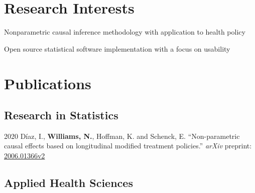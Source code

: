 \documentclass[12pt,letterpaper]{report}
\newcommand{\listitemspace}{0.15em}
\renewenvironment{itemize}
{\begin{list}{}{\setlength{\leftmargin}{0em}
            \setlength{\parskip}{0em}
            \setlength{\itemsep}{\listitemspace}
            \setlength{\parsep}{\listitemspace}}}
    {\end{list}}
\begin{document}
    \section*{Research Interests}

    \begin{itemize}

        \item Nonparametric causal inference methodology with application to health policy

        \item Open source statistical software implementation with a focus on usability

    \end{itemize}

    \section*{Publications}

    \subsection*{Research in Statistics}

    \begin{tablist}
    
        	\item[2020] \tab Díaz, I., \textbf{Williams, N.}, Hoffman, K. and Schenck, E. \enquote{Non-parametric causal effects based on longitudinal modified treatment policies.} \textit{arXiv} preprint: \href{https://arxiv.org/abs/2006.01366v2}{2006.01366v2} 
    	
    \end{tablist}

    \subsection*{Applied Health Sciences}
\end{document}
